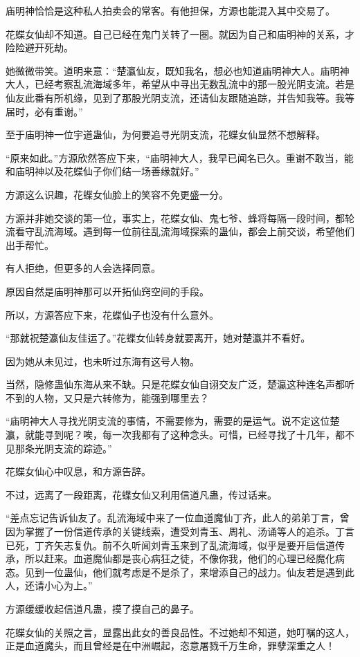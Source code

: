 \begin{this_body}
庙明神恰恰是这种私人拍卖会的常客。有他担保，方源也能混入其中交易了。

花蝶女仙却不知道。自己已经在鬼门关转了一圈。就因为自己和庙明神的关系，才险险避开死劫。

她微微带笑。道明来意：“楚瀛仙友，既知我名，想必也知道庙明神大人。庙明神大人，已经考察乱流海域多年，希望从中寻出无数乱流中的那一股光阴支流。若是仙友此番有所机缘，见到了那股光阴支流，还请仙友跟随追踪，并告知我等。我等届时，必有重谢。”

至于庙明神一位宇道蛊仙，为何要追寻光阴支流，花蝶女仙显然不想解释。

“原来如此。”方源欣然答应下来，“庙明神大人，我早已闻名已久。重谢不敢当，能和庙明神以及花蝶仙子你们结一场善缘就好。”

方源这么识趣，花蝶女仙脸上的笑容不免更盛一分。

方源并非她交谈的第一位，事实上，花蝶女仙、鬼七爷、蜂将每隔一段时间，都轮流看守乱流海域。遇到每一位前往乱流海域探索的蛊仙，都会上前交谈，希望他们出手帮忙。

有人拒绝，但更多的人会选择同意。

原因自然是庙明神那可以开拓仙窍空间的手段。

所以，方源答应下来，花蝶仙子也没有什么意外。

“那就祝楚瀛仙友佳运了。”花蝶女仙转身就要离开，她对楚瀛并不看好。

因为她从未见过，也未听过东海有这号人物。

当然，隐修蛊仙东海从来不缺。只是花蝶女仙自诩交友广泛，楚瀛这种连名声都听不到的人物，又只是六转修为，能强到哪里去？

“庙明神大人寻找光阴支流的事情，不需要修为，需要的是运气。说不定这位楚瀛，就能寻到呢？唉，每一次我都有了这种念头。可惜，已经寻找了十几年，都不见那条光阴支流的踪迹。”

花蝶女仙心中叹息，和方源告辞。

不过，远离了一段距离，花蝶女仙又利用信道凡蛊，传过话来。

“差点忘记告诉仙友了。乱流海域中来了一位血道魔仙丁齐，此人的弟弟丁言，曾因为掌握了一份信道传承的关键线索，遭受刘青玉、周礼、汤诵等人的追杀。丁言已死，丁齐矢志复仇。前不久听闻刘青玉来到了乱流海域，似乎是要开启信道传承，所以赶来。血道魔仙都是丧心病狂之徒，不像你我，他们的心理已经魔化病态。见到一位蛊仙，他们就考虑是不是杀了，来增添自己的战力。仙友若是遇到此人，还请小心为上。”

方源缓缓收起信道凡蛊，摸了摸自己的鼻子。

花蝶女仙的关照之言，显露出此女的善良品性。不过她却不知道，她叮嘱的这人，正是血道魔头，而且曾经是在中洲崛起，恣意屠戮千万生命，罪孽深重之人！

\end{this_body}

